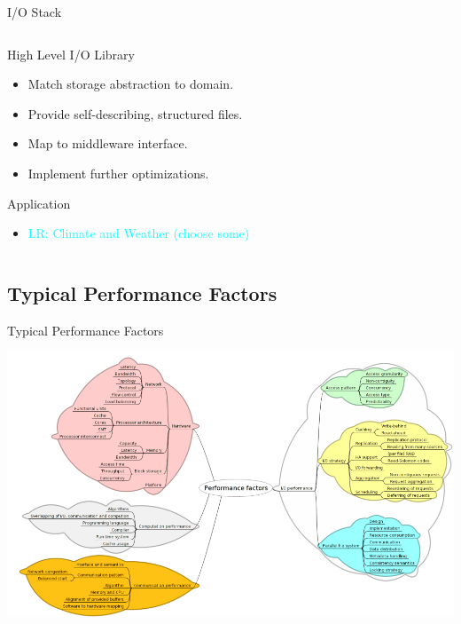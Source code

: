 \documentclass[compress,11pt,xcolor=svgnames,aspectratio=169]{beamer}
\newcommand{\lr}[1]{\textcolor{cyan}{LR: #1}}
\begin{document}
\begin{frame}[fragile]{I/O Stack}
{\begin{columns}
\begin{column}{0.28\textwidth}
\begin{block}{High Level I/O Library}
\begin{itemize}
\item Match storage abstraction to domain.
\item Provide self-describing, structured files.
\item Map to middleware interface.
\item Implement further optimizations.
\end{itemize}
\end{block}
\begin{block}{Application}
\begin{itemize}
\item \lr{Climate and Weather (choose some)}
\end{itemize}
\end{block}
\end{column}
\end{columns}

}

\end{frame}

\subsection{Typical Performance Factors}

\begin{frame}[fragile]{Typical Performance Factors}

\begin{center}
\includegraphics[scale=0.44]{fig/tree-perf}
\end{center}

\nocite{SOPPOAASLK13}

\end{frame}
\end{document}
